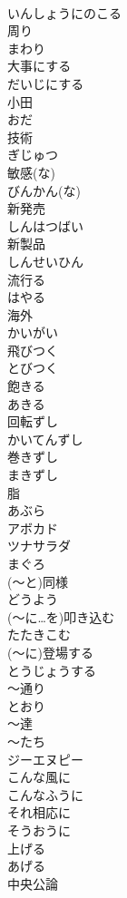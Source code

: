 \documentclass[8pt]{extreport}
\begin{document}
\begin{CJK}{UTF8}{min}
\\	いんしょうにのこる
\\	周り	
\\	まわり
\\	大事にする	
\\	だいじにする
\\	小田	
\\	おだ
\\	技術	
\\	ぎじゅつ
\\	敏感(な)	
\\	びんかん(な)
\\	新発売	
\\	しんはつばい
\\	新製品	
\\	しんせいひん
\\	流行る	
\\	はやる
\\	海外	
\\	かいがい
\\	飛びつく	
\\	とびつく
\\	飽きる	
\\	あきる
\\	回転ずし	
\\	かいてんずし
\\	巻きずし	
\\	まきずし
\\	脂	
\\	あぶら
\\	アボカド	
\\	ツナサラダ	
\\	まぐろ	
\\	(～と)同様	
\\	どうよう
\\	(～に…を)叩き込む	
\\	たたきこむ
\\	(～に)登場する	
\\	とうじょうする
\\	～通り	
\\	とおり
\\	～達	
\\	～たち
\\	ジーエヌピー
\\	こんな風に	
\\	こんなふうに
\\	それ相応に	
\\	そうおうに
\\	上げる	
\\	あげる
\\	中央公論	

\end{CJK}
\end{document}
